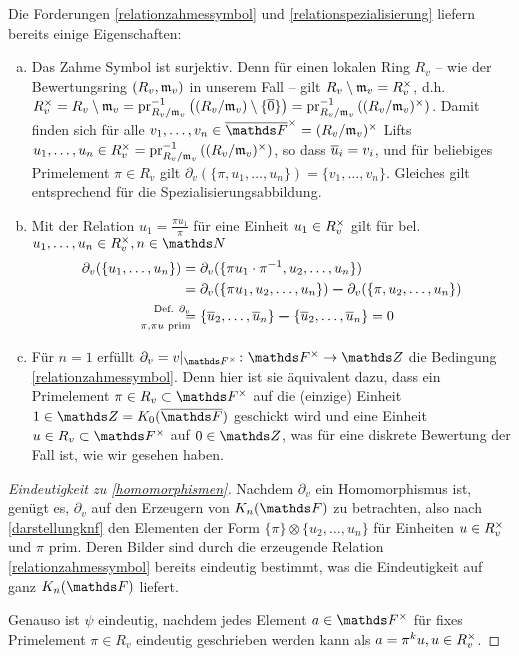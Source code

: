 \documentclass[ngerman,fontsize=11pt, paper=a4, parskip=half, titlepage=true, toc=bib]{scrartcl}
\begin{document}
\begin{Bem}\label{bemhomomorphismen}
  Die Forderungen \ref{relationzahmessymbol} und
  \ref{relationspezialisierung} liefern bereits einige Eigenschaften:
  \begin{enumerate}[a)]
  \item Das Zahme Symbol ist surjektiv. 
    Denn für einen lokalen Ring
    $R_v$ – wie der Bewertungsring $(R_v,\mathfrak{m}_v)$ in unserem Fall –
    gilt $R_v\setminus\mathfrak{m}_v=R^\times_v$, d.h. $R^\times_v=R_v\setminus\mathfrak{m}_v
    =\operatorname{pr}_{R_v/\mathfrak{m}_v}^{-1}\left((R_v/\mathfrak{m}_v)\setminus \{\overline0\}\right)
    =\operatorname{pr}_{R_v/\mathfrak{m}_v}^{-1}\left( (R_v/\mathfrak{m}_v)^\times\right)$. 
    Damit finden sich für alle 
    $v_1,\dotsc,v_n\in \bFx = (R_v/\frakm_v)^\times$
    Lifts $u_1,\dotsc, u_n\in R^\times_v    
    =\operatorname{pr}_{R_v/\mathfrak{m}_v}^{-1}\left( (R_v/\mathfrak{m}_v)^\times \right)$,
    so dass $\overline u_i=v_i$, 
    und für beliebiges Primelement $\pi\in R_v$ gilt
    $\partial_v(\{\pi,u_1,\dotsc, u_n\})=\{v_1,\dotsc, v_n\}$.
    Gleiches gilt entsprechend für die Spezialisierungsabbildung.
  \item   Mit der Relation $u_1=\frac{\pi u_1}{\pi}$
    für eine Einheit $u_1\in R^\times_v$
    gilt für bel. $u_1,\dotsc, u_n\in \Rx_v, n\in\N$
    \begin{align*}
      \partial_v(\{u_1,\dotsc,u_n\})
      &= \partial_v(\{\pi u_1\cdot \pi^{-1},u_2,\dotsc,u_n\})\\
      &= \partial_v(\{\pi u_1,u_2,\dotsc,u_n\})\m 
        \partial_v(\{\pi,u_2,\dotsc,u_n\})\\
      &\overset{\mathllap{\text{Def. }\partial_v}}{
        \underset{\mathllap{\pi,\pi u\text{ prim}}}{=}}
        \{\ov u_2,\dotsc, \ov u_n\} \m \{\ov u_2,\dotsc, \ov u_n\}
        = 0
    \end{align*}
  \item Für $n=1$ erfüllt $\partial_v=v|_{\Fx}\colon \Fx\to \Z$ 
    die Bedingung \ref{relationzahmessymbol}.
    Denn hier ist sie äquivalent dazu, dass ein Primelement 
    $\pi\in R_v\subset \Fx$ auf die (einzige) Einheit $1\in\Z=\K_0(\bF)$ 
    geschickt wird und eine Einheit $u\in R_v\subset \Fx$ auf $0\in\Z$,
    was für eine diskrete Bewertung der Fall ist, wie wir gesehen haben.
  \end{enumerate}
\end{Bem}

\begin{proof}[Eindeutigkeit zu \ref{homomorphismen}]
  Nachdem $\partial_v$ ein Homomorphismus ist, genügt es, $\partial_v$ auf
  den Erzeugern von $\KnF$ zu betrachten, also nach \ref{darstellungknf} den
  Elementen der Form $\{\pi\}\otimes\{u_{2},\dotsc,u_{n}\}$ für
  Einheiten $u\in R^\times_v$ und $\pi$ prim.
  Deren Bilder sind durch die erzeugende Relation 
  \ref{relationzahmessymbol} bereits eindeutig
  bestimmt, was die Eindeutigkeit auf ganz $\KnF$ liefert.
  
  Genauso ist $\psi$ eindeutig, nachdem jedes Element $a\in\Fx$ für
  fixes Primelement $\pi\in R_v$ eindeutig geschrieben werden kann als
  $a=\pi^k u, u\in R^\times_v$.
\end{proof}
\end{document}
